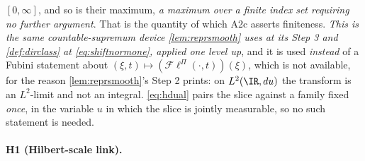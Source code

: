 $[0,\infty]$, and so is their maximum, \emph{a maximum over a finite index set requiring no further
argument}. That is the quantity of which A2c asserts finiteness.
\emph{This is the same countable-supremum device \cref{lem:reprsmooth} uses at its Step 3 and
\cref{def:dirclass} at \eqref{eq:shiftnormone}, applied one level up}, and it is used \emph{instead}
of a Fubini statement about $(\xi,t)\mapsto(\mathcal F\ell^\Pi(\cdot,t))(\xi)$, which is not available,
for the reason \cref{lem:reprsmooth}'s Step 2 prints: on $L^{2}(\IR,du)$ the transform is an
$L^{2}$-limit and not an integral. \eqref{eq:hdual} pairs the slice against a family fixed \emph{once},
in the variable $u$ in which the slice is jointly measurable, so no such statement is needed.


\paragraph{H1 (Hilbert-scale link).}

